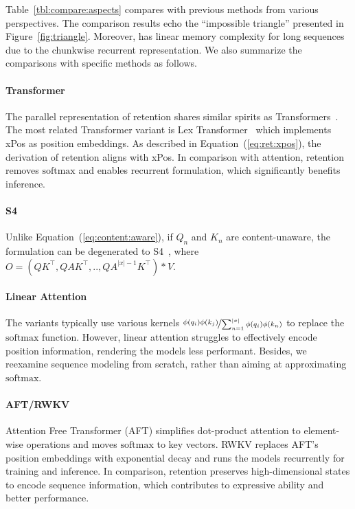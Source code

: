 Table~\ref{tbl:compare:aspects} compares \our{} with previous methods from various perspectives. The comparison results echo the ``impossible triangle'' presented in Figure~\ref{fig:triangle}.
Moreover, \our{} has linear memory complexity for long sequences due to the chunkwise recurrent representation. We also summarize the comparisons with specific methods as follows.

\paragraph{Transformer}
The parallel representation of retention shares similar spirits as Transformers~\cite{transformer}. The most related Transformer variant is Lex Transformer~\cite{lex} which implements xPos as position embeddings. As described in Equation~(\ref{eq:ret:xpos}), the derivation of retention aligns with xPos. In comparison with attention, retention removes $\mathrm{softmax}$ and enables recurrent formulation, which significantly benefits inference.

\paragraph{S4}
Unlike Equation~(\ref{eq:content:aware}), if $Q_n$ and $K_n$ are content-unaware, the formulation can be degenerated to S4~\cite{s4}, where $O = (Q K^\intercal, Q A K^\intercal, .., Q A^{|x|-1} K^\intercal) * V$.

\paragraph{Linear Attention} The variants typically use various kernels $\nicefrac{\phi(q_i)\phi(k_j)}{\sum_{n=1}^{|x|}\phi(q_i)\phi(k_n)}$ to replace the $\mathrm{softmax}$ function. However, linear attention struggles to effectively encode position information, rendering the models less performant. Besides, we reexamine sequence modeling from scratch, rather than aiming at approximating $\mathrm{softmax}$.

\paragraph{AFT/RWKV}
Attention Free Transformer (AFT) simplifies dot-product attention to element-wise operations and moves $\mathrm{softmax}$ to key vectors. RWKV replaces AFT's position embeddings with exponential decay and runs the models recurrently for training and inference. In comparison, retention preserves high-dimensional states to encode sequence information, which contributes to expressive ability and better performance.

